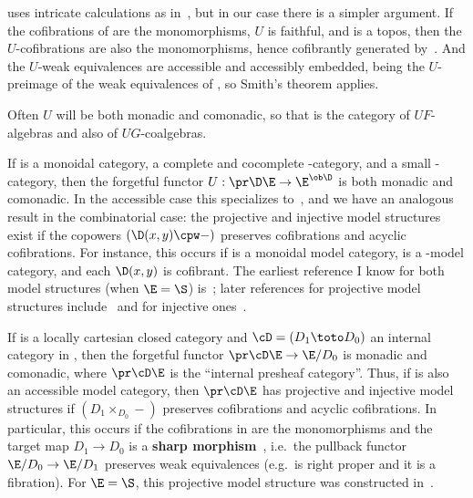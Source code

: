 \begin{rmk}
  \cite[Remark 3.8]{mr:cellular} uses intricate calculations as in~\cite[A.3.3.3]{lurie:higher-topoi}, but in our case there is a simpler argument.
  If the cofibrations of \N are the monomorphisms, $U$ is faithful, and \M is a topos, then the $U$-cofibrations are also the monomorphisms, hence cofibrantly generated by~\cite[Proposition 1.12]{beke:sheafifiable}.
  And the $U$-weak equivalences are accessible and accessibly embedded, being the $U$-preimage of the weak equivalences of \N, so Smith's theorem applies.
\end{rmk}

Often $U$ will be both monadic and comonadic, so that \M is the category of $UF$-algebras and also of $UG$-coalgebras.

\begin{eg}\label{eg:enrcat}
  If \V is a monoidal category, \E a complete and cocomplete \V-category, and \D a small \V-category, then the forgetful functor $U : \pr\D\E \to \E^{\ob\D}$ is both monadic and comonadic. %
  In the accessible case this specializes to~\cite{moser:injproj}, and we have an analogous result in the combinatorial case: the projective and injective model structures exist if the copowers $(\D(x,y)\cpw -)$ preserves cofibrations and acyclic cofibrations.
  For instance, this occurs if \V is a monoidal model category, \E is a \V-model category, and each $\D(x,y)$ is cofibrant.
  The earliest reference I know for both model structures (when $\E=\S$) is~\cite{heller:htpythys}; later references for projective model structures include~\cite{piacenza:hodia,hirschhorn:modelcats,dro:enrfunc} and for injective ones~\cite{lurie:higher-topoi,moser:injproj}.
\end{eg}

\begin{eg}\label{eg:intcat}
  If \E is a locally cartesian closed category and $\cD = (D_1 \toto D_0)$ an internal category in \E, then the forgetful functor $\pr \cD \E \to \E/D_0$ is monadic and comonadic, where $\pr \cD \E$ is the ``internal presheaf category''.
  Thus, if \E is also an accessible model category, then $\pr \cD \E$ has projective and injective model structures if $(D_1 \times_{D_0} -)$ preserves cofibrations and acyclic cofibrations.
  In particular, this occurs if the cofibrations in \E are the monomorphisms and the target map $D_1 \to D_0$ is a \textbf{sharp morphism}~\cite{rezk:sharp-maps}, i.e.\ the pullback functor $\E/D_0 \to \E/D_1$ preserves weak equivalences (e.g.\ \E is right proper and it is a fibration).
  For $\E=\S$, this projective model structure was constructed in~\cite[Proposition 6.6]{horel:model-intsscat}.
\end{eg}

